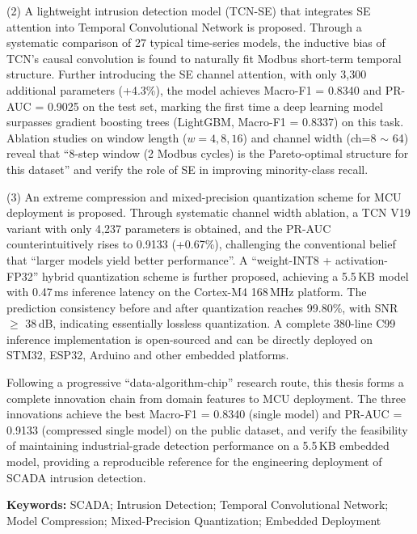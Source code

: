\par (2) A lightweight intrusion detection model (TCN-SE) that integrates SE
attention into Temporal Convolutional Network is proposed. Through a systematic
comparison of 27 typical time-series models, the inductive bias of TCN's causal
convolution is found to naturally fit Modbus short-term temporal structure.
Further introducing the SE channel attention, with only 3{,}300 additional parameters
(+4.3\%), the model achieves Macro-F1 = 0.8340 and PR-AUC = 0.9025 on the test
set, marking the first time a deep learning model surpasses gradient boosting
trees (LightGBM, Macro-F1 = 0.8337) on this task. Ablation studies on window
length ($w=4, 8, 16$) and channel width (ch=8 $\sim$ 64) reveal that ``8-step
window (2 Modbus cycles) is the Pareto-optimal structure for this dataset'' and
verify the role of SE in improving minority-class recall.

\par (3) An extreme compression and mixed-precision quantization scheme for MCU
deployment is proposed. Through systematic channel width ablation, a TCN V19
variant with only 4{,}237 parameters is obtained, and the PR-AUC counterintuitively
rises to 0.9133 (+0.67\%), challenging the conventional belief that ``larger models
yield better performance''. A ``weight-INT8 + activation-FP32'' hybrid quantization
scheme is further proposed, achieving a 5.5\,KB model with 0.47\,ms inference latency
on the Cortex-M4 168\,MHz platform. The prediction consistency before and after
quantization reaches 99.80\%, with SNR $\geq$ 38\,dB, indicating essentially lossless
quantization. A complete 380-line C99 inference implementation is open-sourced and
can be directly deployed on STM32, ESP32, Arduino and other embedded platforms.

\par Following a progressive ``data-algorithm-chip'' research route, this thesis
forms a complete innovation chain from domain features to MCU deployment. The
three innovations achieve the best Macro-F1 = 0.8340 (single model) and
PR-AUC = 0.9133 (compressed single model) on the public dataset, and verify the
feasibility of maintaining industrial-grade detection performance on a 5.5\,KB
embedded model, providing a reproducible reference for the engineering deployment
of SCADA intrusion detection.

\vspace{1em}

\noindent\textbf{Keywords:} SCADA; Intrusion Detection; Temporal Convolutional
Network; Model Compression; Mixed-Precision Quantization; Embedded Deployment

\clearpage
